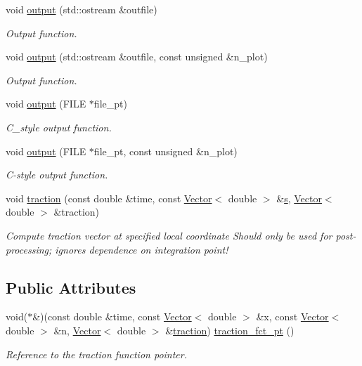 \begin{DoxyCompactItemize}
void \hyperlink{classoomph_1_1LinearElasticityTractionElement_a1d0d93c959c51f92c9ac40a71c0a85db}{output} (std\+::ostream \&outfile)
\begin{DoxyCompactList}\small\item\em Output function. \end{DoxyCompactList}\item 
void \hyperlink{classoomph_1_1LinearElasticityTractionElement_a396767d3d935bd219bf2161ed461a174}{output} (std\+::ostream \&outfile, const unsigned \&n\+\_\+plot)
\begin{DoxyCompactList}\small\item\em Output function. \end{DoxyCompactList}\item 
void \hyperlink{classoomph_1_1LinearElasticityTractionElement_a6b5134b3460ac380e9cca892d5b4a0a3}{output} (F\+I\+LE $\ast$file\+\_\+pt)
\begin{DoxyCompactList}\small\item\em C\+\_\+style output function. \end{DoxyCompactList}\item 
void \hyperlink{classoomph_1_1LinearElasticityTractionElement_a0f06ed03bad8c609bd546ea5e4ebdf6d}{output} (F\+I\+LE $\ast$file\+\_\+pt, const unsigned \&n\+\_\+plot)
\begin{DoxyCompactList}\small\item\em C-\/style output function. \end{DoxyCompactList}\item 
void \hyperlink{classoomph_1_1LinearElasticityTractionElement_aefc580c2f9219976426f5c0b5f70ca77}{traction} (const double \&time, const \hyperlink{classoomph_1_1Vector}{Vector}$<$ double $>$ \&\hyperlink{cfortran_8h_ab7123126e4885ef647dd9c6e3807a21c}{s}, \hyperlink{classoomph_1_1Vector}{Vector}$<$ double $>$ \&traction)
\begin{DoxyCompactList}\small\item\em Compute traction vector at specified local coordinate Should only be used for post-\/processing; ignores dependence on integration point! \end{DoxyCompactList}\end{DoxyCompactItemize}
\subsection*{Public Attributes}
\begin{DoxyCompactItemize}
\item 
void($\ast$\&)(const double \&time, const \hyperlink{classoomph_1_1Vector}{Vector}$<$ double $>$ \&x, const \hyperlink{classoomph_1_1Vector}{Vector}$<$ double $>$ \&n, \hyperlink{classoomph_1_1Vector}{Vector}$<$ double $>$ \&\hyperlink{classoomph_1_1LinearElasticityTractionElement_aefc580c2f9219976426f5c0b5f70ca77}{traction}) \hyperlink{classoomph_1_1LinearElasticityTractionElement_a2756f6824ef495ce20ac722c35a0f4f8}{traction\+\_\+fct\+\_\+pt} ()
\begin{DoxyCompactList}\small\item\em Reference to the traction function pointer. \end{DoxyCompactList}\end{DoxyCompactItemize}
